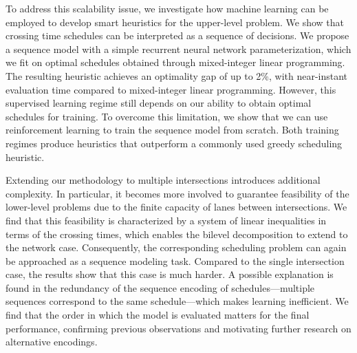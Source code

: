 \documentclass[a4paper]{report}
\theoremstyle{definition}
\theoremstyle{plain}
\begin{document}
{To address this scalability issue, we investigate how machine learning can be
employed to develop smart heuristics for the upper-level problem.
%
We show that crossing time schedules can be interpreted as a sequence of
decisions.
%
We propose a sequence model with a simple recurrent neural network
parameterization, which we fit on optimal schedules obtained through
mixed-integer linear programming.
%
The resulting heuristic achieves an optimality gap of up to 2\%, with
near-instant evaluation time compared to mixed-integer linear programming.
%
However, this supervised learning regime still depends on our ability to obtain
optimal schedules for training.
%
To overcome this limitation, we show that we can use reinforcement learning to
train the sequence model from scratch.
%
Both training regimes produce heuristics that outperform a commonly used greedy
scheduling heuristic.

Extending our methodology to multiple intersections introduces additional
complexity. In particular, it becomes more involved to guarantee feasibility of
the lower-level problems due to the finite capacity of lanes between
intersections.
%
We find that this feasibility is characterized by a system of linear
inequalities in terms of the crossing times, which enables the bilevel
decomposition to extend to the network case.
%
Consequently, the corresponding scheduling problem can again be approached as a
sequence modeling task.
%
Compared to the single intersection case, the results show that this case is
much harder.
%
A possible explanation is found in the redundancy of the sequence encoding of
schedules---multiple sequences correspond to the same schedule---which makes
learning inefficient.
%
We find that the order in which the model is evaluated matters for the final
performance, confirming previous observations and motivating further research on
alternative encodings. }


\renewcommand{\cftpartfont}{\color{red!70!black}}
\renewcommand{\cftpartpresnum}{}

\makeatletter
\renewcommand{\toclevel@part}{100}
\makeatother


\renewcommand{\cftdot}{\textcolor{gray!70}{.}}
\end{document}

